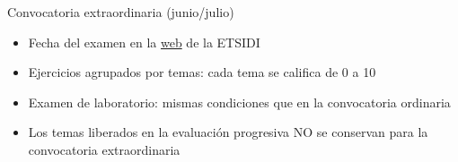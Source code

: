 \documentclass[aspectratio=169, usenames,svgnames,dvipsnames]{beamer}
\begin{document}

\begin{frame}{Convocatoria extraordinaria (junio/julio)}

    \vspace{-18mm}
    \begin{itemize}
        \item Fecha del examen en la \href{https://www.etsidi.upm.es/Estudiantes/AgendaAcademica/AAFechaExamenes}{web} de la ETSIDI
        \item Ejercicios agrupados por temas: cada tema se califica de 0 a 10
        \item Examen de laboratorio: mismas condiciones que en la convocatoria ordinaria

        \vspace{6mm}

        \item Los temas liberados en la evaluación progresiva \alert{NO} se conservan para la convocatoria extraordinaria
    \end{itemize}

\end{frame}
        
\end{document}
